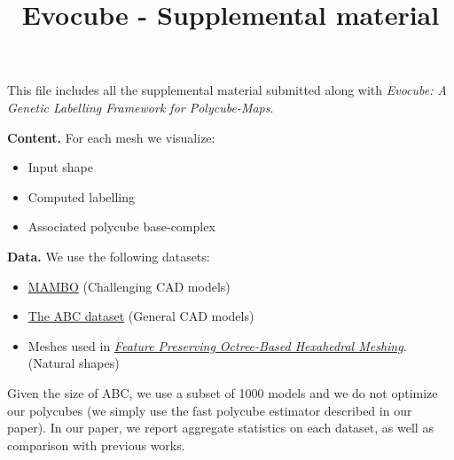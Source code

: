 \normalsize%
\title{Evocube {-} Supplemental material}%
\date{}%
\maketitle%
\large%
This file includes all the supplemental material submitted along with \textit{Evocube: A Genetic Labelling Framework for Polycube-Maps}.%

%
\vspace{20pt}%
\textbf{Content. }%
For each mesh we visualize:%
\begin{itemize}%
\item%
Input shape%
\item%
Computed labelling%
\item%
Associated polycube base{-}complex%
\end{itemize}%

%
\vspace{20pt}%
\textbf{Data. }%
We use the following datasets:%
\begin{itemize}%
\item%
\href{https://gitlab.com/franck.ledoux/mambo}{MAMBO} (Challenging CAD models)%
\item%
\href{https://deep-geometry.github.io/abc-dataset/}{The ABC dataset} (General CAD models)%
\item%
Meshes used in \href{https://gaoxifeng.github.io/}{\textit{Feature Preserving Octree-Based Hexahedral Meshing}}. (Natural shapes)%
\end{itemize}%
%
\vspace{20pt}%

Given the size of ABC, we use a subset of 1000 models and we do not optimize our polycubes (we simply use the fast polycube estimator described in our paper). 
In our paper, we report aggregate statistics on each dataset, as well as comparison with previous works.

\normalsize%
\clearpage%
%
%